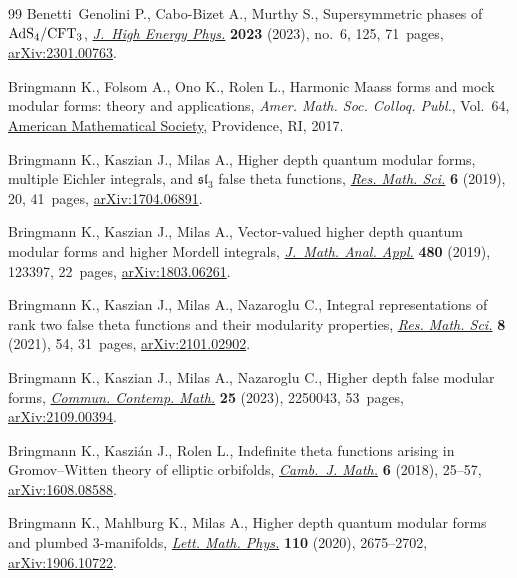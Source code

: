 \documentclass[10pt,a4paper]{amsart}
\theoremstyle{definition}
\numberwithin{equation}{section}
\begin{document}
\begin{thebibliography}{99}
Benetti~Genolini P., Cabo-Bizet A., Murthy S., Supersymmetric phases of {${\rm
 AdS}_4/{\rm CFT}_3$}, \href{https://doi.org/10.1007/jhep06(2023)125}{\textit{J.~High Energy Phys.}} \textbf{2023} (2023),
 no.~6, 125, 71~pages, \href{https://arxiv.org/abs/2301.00763}{arXiv:2301.00763}.

Bringmann K., Folsom A., Ono K., Rolen L., Harmonic {M}aass forms and mock
 modular forms: theory and applications, \textit{Amer. Math. Soc. Colloq.
 Publ.}, Vol.~64, \href{https://doi.org/10.1090/coll/064}{American Mathematical Society}, Providence, RI, 2017.

Bringmann K., Kaszian J., Milas A., Higher depth quantum modular forms,
 multiple {E}ichler integrals, and {$\mathfrak{sl}_3$} false theta functions,
 \href{https://doi.org/10.1007/s40687-019-0182-4}{\textit{Res. Math. Sci.}} \textbf{6} (2019), 20, 41~pages,
 \href{https://arxiv.org/abs/1704.06891}{arXiv:1704.06891}.

Bringmann K., Kaszian J., Milas A., Vector-valued higher depth quantum modular
 forms and higher {M}ordell integrals, \href{https://doi.org/10.1016/j.jmaa.2019.123397}{\textit{J.~Math. Anal. Appl.}}
 \textbf{480} (2019), 123397, 22~pages, \href{https://arxiv.org/abs/1803.06261}{arXiv:1803.06261}.

Bringmann K., Kaszian J., Milas A., Nazaroglu C., Integral representations of
 rank two false theta functions and their modularity properties, \href{https://doi.org/10.1007/s40687-021-00284-1}{\textit{Res.
 Math. Sci.}} \textbf{8} (2021), 54, 31~pages, \href{https://arxiv.org/abs/2101.02902}{arXiv:2101.02902}.

Bringmann K., Kaszian J., Milas A., Nazaroglu C., Higher depth false modular
 forms, \href{https://doi.org/10.1142/S0219199722500432}{\textit{Commun. Contemp. Math.}} \textbf{25} (2023), 2250043, 53~pages,
 \href{https://arxiv.org/abs/2109.00394}{arXiv:2109.00394}.

Bringmann K., Kaszi\'an J., Rolen L., Indefinite theta functions arising in
 {G}romov--{W}itten theory of elliptic orbifolds, \href{https://doi.org/10.4310/CJM.2018.v6.n1.a2}{\textit{Camb.~J. Math.}}
 \textbf{6} (2018), 25--57, \href{https://arxiv.org/abs/1608.08588}{arXiv:1608.08588}.

Bringmann K., Mahlburg K., Milas A., Higher depth quantum modular forms and
 plumbed 3-manifolds, \href{https://doi.org/10.1007/s11005-020-01310-z}{\textit{Lett. Math. Phys.}} \textbf{110} (2020),
 2675--2702, \href{https://arxiv.org/abs/1906.10722}{arXiv:1906.10722}.


\end{thebibliography}
\end{document}
